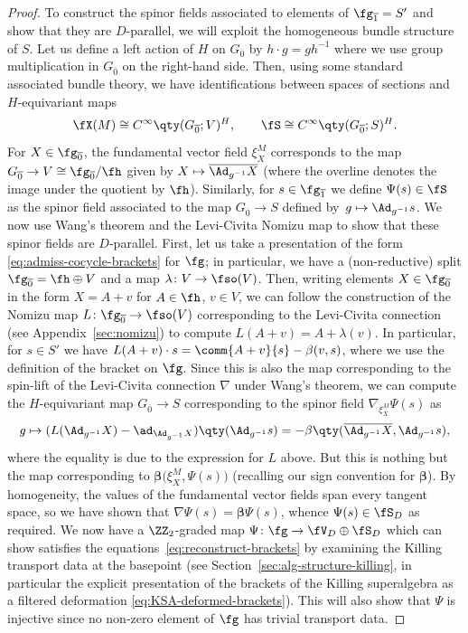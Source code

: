 \begin{proof}
	To construct the spinor fields associated to elements of $\fg_{\overline 1}=S'$ and show that they are $D$-parallel, we will exploit the homogeneous bundle structure of $S$. Let us define a left action of $H$ on $G_{\overline 0}$ by $h\cdot g=gh^{-1}$ where we use group multiplication in $G_{\overline 0}$ on the right-hand side. Then, using some standard associated bundle theory, we have identifications between spaces of sections and $H$-equivariant maps
	\[
		\fX(M) \cong C^\infty\qty(G_{\overline 0};V)^H,\qquad
		\fS \cong C^\infty\qty(G_{\overline 0};S)^H.
	\]
	For $X\in\fg_{\overline 0}$, the fundamental vector field $\xi^M_X$ corresponds to the map $G_{\overline 0}\to V\cong\fg_{\overline 0}/\fh$ given by $X\mapsto \overline{\Ad_{g^{-1}}X}$ (where the overline denotes the image under the quotient by $\fh$). Similarly, for $s\in \fg_{\overline 1}$ we define $\Psi(s)\in\fS$ as the spinor field associated to the map $G_{\overline 0}\to S$ defined by~${g\mapsto \Ad_{g^{-1}}s}$. We now use Wang's theorem and the Levi-Civita Nomizu map to show that these spinor fields are $D$-parallel. First, let us take a presentation of the form \eqref{eq:admiss-cocycle-brackets} for $\fg$; in particular, we have a (non-reductive) split $\fg_{\overline0}=\fh\oplus V$ and a map $\lambda\colon V\to\fso(V)$. Then, writing elements $X\in\fg_{\overline 0}$ in the form $X=A+v$ for $A\in\fh$, $v\in V$, we can follow the construction of the Nomizu map $L\colon \fg_{\overline 0}\to\fso(V)$ corresponding to the Levi-Civita connection (see Appendix~\ref{sec:nomizu}) to compute
$L(A+v) = A + \lambda(v)$.
	In particular, for $s\in S'$ we have $L(A+v)\cdot s = \comm{A+v}{s} - \beta(v,s)$, where we use the definition of the bracket on $\fg$. Since this is also the map corresponding to the spin-lift of the Levi-Civita connection $\nabla$ under Wang's theorem, we can compute the $H$-equivariant map $G_{\overline 0}\to S$ corresponding to the spinor field $\nabla_{\xi^M_X}\Psi(s)$ as
	\[
		g \mapsto (L(\Ad_{g^{-1}}X) - \ad_{\Ad_{g^{-1}}X})\qty(\Ad_{g^{-1}}s) = - \beta\qty(\overline{\Ad_{g^{-1}}X},\Ad_{g^{-1}}s),
	\]
	where the equality is due to the expression for $L$ above. But this is nothing but the map corresponding to $\boldsymbol{\beta}\bigl(\xi^M_X,\Psi(s)\bigr)$ (recalling our sign convention for $\boldsymbol{\beta}$). By homogeneity, the values of the fundamental vector fields span every tangent space, so we have shown that $\nabla\Psi(s)=\boldsymbol{\beta}\Psi(s)$, whence $\Psi(s)\in\fS_D$ as required. We now have a $\ZZ_2$-graded map $\Psi\colon\fg\to\fV_D\oplus\fS_D$ which can show satisfies the equations~\eqref{eq:reconstruct-brackets} by examining the Killing transport data at the basepoint (see Section~\ref{sec:alg-structure-killing}, in particular the explicit presentation of the brackets of the Killing superalgebra as a filtered deformation \eqref{eq:KSA-deformed-brackets}). This will also show that $\Psi$ is injective since no non-zero element of $\fg$ has trivial transport data.
	

\end{proof}
